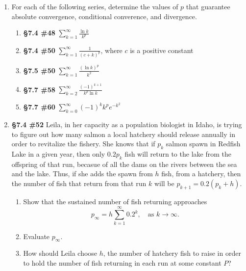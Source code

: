 \documentclass[%
]{article}
\begin{document}
\begin{enumerate}
\item For each of the following series, determine the values of $p$ that guarantee absolute convergence, conditional converence, and divergence.
	\begin{enumerate}
	\item {\bf \S7.4 \#48} $\displaystyle \sum_{k=1}^{\infty}\frac{\ln k}{k^p}$
	\item {\bf \S7.4 \#50} $\displaystyle \sum_{k=1}^{\infty}\frac{1}{(c+k)^p}$, where $c$ is a positive constant
	\item {\bf \S7.5 \#50} $\displaystyle \sum_{k=1}^{\infty}\frac{(\ln k)^p}{k^2}$
	\item {\bf \S7.7 \#58} $\displaystyle \sum_{k=2}^{\infty}\frac{(-1)^{k+1}}{k^p\ln k}$
	\item {\bf \S7.7 \#60} $\displaystyle \sum_{k=0}^{\infty}(-1)^kk^pe^{-k^2}$
	\end{enumerate}

\item {\bf \S7.4 \#52} Leila, in her capacity as a population biologist in Idaho, is trying to figure out how many salmon a local hatchery should release annually in order to revitalize the fishery.  She knows that if $p_k$ salmon spawn in Redfish Lake in a given year, then only $0.2p_k$ fish will return to the lake from the offspring of that run, becasue of all the dams on the rivers between the sea and the lake.  Thus, if she adds the spawn from $h$ fish, from a hatchery, then the number of fish that return from that run $k$ will be $p_{k+1}=0.2(p_k+h)$.   	
	\begin{enumerate}
	\item Show that the sustained number of fish returning approaches 
	\[
	p_{\infty}=h\sum_{k=1}^{\infty}0.2^k,\quad \text{as $k\to\infty$.}
	\]
	\item Evaluate $p_{\infty}$.
	\item How should Leila choose $h$, the number of hatchery fish to raise in order to hold the number of fish returning in each run at some constant $P$?
	\end{enumerate}


\end{enumerate}
\end{document}
